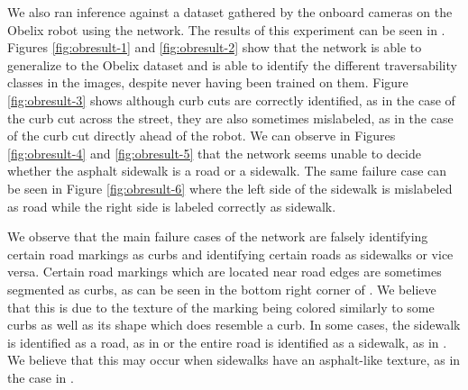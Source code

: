 We also ran inference against a dataset gathered by the onboard cameras on the Obelix robot using the network.
The results of this experiment can be seen in .
Figures \ref{fig:obresult-1} and \ref{fig:obresult-2} show that the network is able to generalize to the Obelix dataset and is able to identify the different traversability classes in the images, despite never having been trained on them.
Figure \ref{fig:obresult-3} shows although curb cuts are correctly identified, as in the case of the curb cut across the street, they are also sometimes mislabeled, as in the case of the curb cut directly ahead of the robot.
We can observe in Figures \ref{fig:obresult-4} and \ref{fig:obresult-5} that the network seems unable to decide whether the asphalt sidewalk is a road or a sidewalk.
The same failure case can be seen in Figure \ref{fig:obresult-6} where the left side of the sidewalk is mislabeled as road while the right side is labeled correctly as sidewalk.

We observe that the main failure cases of the network are falsely identifying certain road markings as curbs and identifying certain roads as sidewalks or vice versa.
Certain road markings which are located near road edges are sometimes segmented as curbs, as can be seen in the bottom right corner of .
We believe that this is due to the texture of the marking being colored similarly to some curbs as well as its shape which does resemble a curb.
In some cases, the sidewalk is identified as a road, as in  or the entire road is identified as a sidewalk, as in .
We believe that this may occur when sidewalks have an asphalt-like texture, as in the case in .
